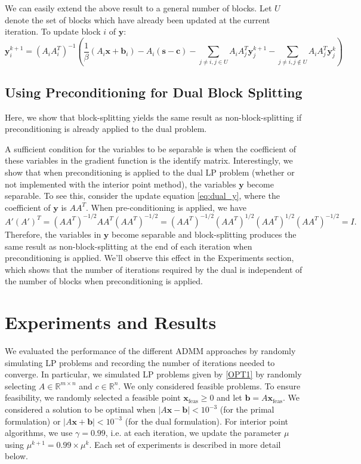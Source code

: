 \documentclass{article}
\begin{document}
We can easily extend the above result to a general number of blocks. Let $U$ denote the set of blocks which have already been updated at the current iteration. To update block $i$ of $\mathbf{y}$:
\[
\mathbf{y}_{i}^{k+1}=\left(A_{i}A_{i}^{T}\right)^{-1}\left(\frac{1}{\beta}\left(A_{i}\mathbf{x}+\mathbf{b}_{i}\right)-A_{i}\left(\mathbf{s}-\mathbf{c}\right)-\sum_{j\neq i,j\in U}A_{i}A_{j}^{T}\mathbf{y}_{j}^{k+1}-\sum_{j\neq i,j\notin U}A_{i}A_{j}^{T}\mathbf{y}_{j}^{k}\right)
\]
\vspace{0.1in}
{ \subsection*{Using Preconditioning for Dual Block Splitting}
Here, we show that block-splitting yields the same result as non-block-splitting if preconditioning is already applied to the dual problem. 

A sufficient condition for the variables to be separable is when the coefficient of these variables in the gradient function is the identify matrix. Interestingly, we show that when preconditioning is applied to the dual LP problem (whether or not implemented with the interior point method), the variables $\mathbf{y}$ become separable. To see this, consider the update equation \eqref{eq:dual_y}, where the coefficient of $\mathbf{y}$ is $A A^T$. When pre-conditioning is applied, we have
\[
A' (A')^T  = (AA^T )^{-1/2}A A^T (AA^T )^{-1/2} =  (AA^T )^{-1/2}(AA^T )^{1/2} (AA^T )^{1/2} (AA^T )^{-1/2}  = I.
\]
Therefore, the variables in $\mathbf{y}$ become separable and block-splitting produces the same result as non-block-splitting at the end of each iteration when preconditioning is applied. We'll observe this effect in the Experiments section, which shows that the number of iterations required by the dual is independent of the number of blocks when preconditioning is applied.

\newpage
\section{Experiments and Results}

We evaluated the performance of the different ADMM approaches by randomly simulating LP problems and recording the number of iterations needed to converge. In particular, we simulated LP problems given by \eqref{OPT1} by randomly selecting $A\in\mathbb{R}^{m \times n}$ and $c\in\mathbb{R}^{n}$. We only considered feasible problems. To ensure feasibility, we randomly selected a feasible point $\mathbf{x}_{\text{feas}}\geq0$ and let $\mathbf{b}=A\mathbf{x}_{\text{feas}}$. We considered a solution to be optimal when $\left|A\mathbf{x}-\mathbf{b}\right|<10^{-3}$ (for the primal formulation) or $\left|A\mathbf{x}+\mathbf{b}\right|<10^{-3}$ (for the dual formulation). For interior point algorithms, we use $\gamma=0.99$, i.e. at each iteration, we update the parameter $\mu$ using $\mu^{k+1} = 0.99 \times \mu^k$. Each set of experiments is described in more detail below.

}
\end{document}
